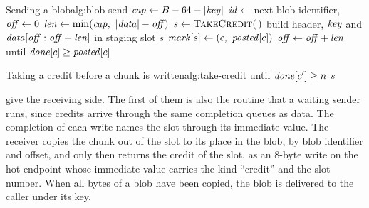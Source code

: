 \begin{pseudocode}{Sending a blob}{alg:blob-send}
    \State $\mathit{cap} \gets B - 64 - |\mathit{key}|$ 
    \State $\mathit{id} \gets$ next blob identifier, $\mathit{off} \gets 0$
    \Repeat
      \State $\mathit{len} \gets \min(\mathit{cap},\ |\mathit{data}| - \mathit{off})$
      \State $s \gets \Call{TakeCredit}{\,}$ 
      \State build header, $\mathit{key}$ and $\mathit{data}[\mathit{off} : \mathit{off}+\mathit{len}]$ in staging slot $s$
      \State {}
      \State $\var{mark}[s] \gets (c,\ \var{posted}[c])$
      \State $\mathit{off} \gets \mathit{off} + \mathit{len}$
    \State {} until $\mathit{done}[c] \ge \mathit{posted}[c]$ 
  \EndFunction
\end{pseudocode}

\begin{pseudocode}{Taking a credit before a chunk is written}{alg:take-credit}
    \Loop
          \State {} until $\mathit{done}[c'] \ge n$ 
        \EndIf
        \State \Return $s$
      \EndIf
      \State {} 
    \EndLoop
  \EndFunction
\end{pseudocode}

 give the receiving side. The first of
them is also the routine that a waiting sender runs, since credits arrive
through the same completion queues as data. The completion of each write names the slot through its
immediate value. The receiver copies the chunk out of the slot to its place
in the blob, by blob identifier and offset, and only then returns the credit
of the slot, as an 8-byte write on the hot endpoint whose immediate value
carries the kind ``credit'' and the slot number. When all bytes of a blob
have been copied, the blob is delivered to the caller under its key.

